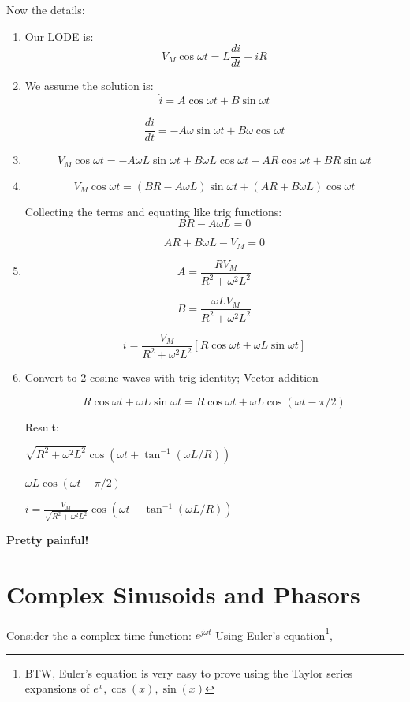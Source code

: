 \noindent
Now the details:

\begin{enumerate}
\item Our LODE is:
\[
V_M\cos\omega t = L\frac{di}{dt} + iR
\]

\item We assume the solution is:
\[
\hat{i} = A\cos\omega t + B\sin\omega t
\]

\[\frac{d\hat{i} } {dt} = -A\omega\sin\omega t + B\omega\cos\omega t
\]

\item
\[
V_M\cos\omega t = -A\omega L\sin\omega t + B\omega L\cos\omega t + AR\cos\omega t + BR\sin\omega t
\]

\item
\[
V_M\cos\omega t = (BR - A\omega L)\sin\omega t + (AR + B\omega L)\cos\omega t
\]

Collecting the terms and equating like trig functions:
\[
BR - A\omega L = 0
\]

\[
AR + B\omega L - V_M = 0
\]

\item
\[
A = \frac{RV_M} {R^2 + \omega^2L^2}
\]

\[
B = \frac{\omega LV_M}{R^2 + \omega^2L^2}
\]

\[
i = \frac{V_M}{R^2 + \omega^2L^2}[R\cos\omega t + \omega L\sin\omega t]
\]

\item Convert to 2 cosine waves with trig identity; Vector addition

\[
R\cos\omega t + \omega L\sin\omega t = R\cos\omega t + \omega L\cos(\omega t - \pi/2)
\]

\noindent Result:

$\sqrt{R^2 + \omega^2L^2}\cos(\omega t + \tan^{-1}(\omega L/R))$

$\omega L\cos(\omega t - \pi/2)$

$i = \frac{V_M}{\sqrt{R^2 + \omega^2L^2}}\cos(\omega t - \tan^{-1}(\omega L/R))$
\end{enumerate}

\noindent
{\bf Pretty painful!}




\section{Complex Sinusoids and Phasors  }

Consider the a complex time function:  $e^{j\omega t}$
Using Euler's equation\footnote{BTW, Euler's equation is very easy to prove using the Taylor series
expansions of $e^x, \cos(x), \sin(x)$},

